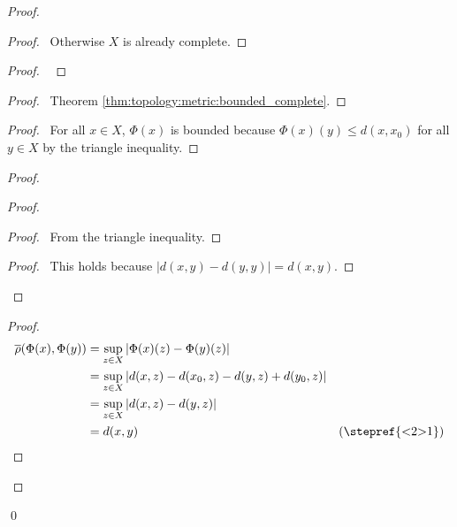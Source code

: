 \begin{proof}
  \pf
  \begin{proof}
    \pf\ Otherwise $X$ is already complete.
  \end{proof}
  \begin{proof}
    \pf\ 
  \end{proof}
  \begin{proof}
    \pf\ Theorem \ref{thm:topology:metric:bounded_complete}.
  \end{proof}
  \begin{proof}
    \pf\ For all $x \in X$, $\Phi(x)$ is bounded because $\Phi(x)(y) \leq d(x, x_0)$ for all $y \in X$ by the triangle inequality.
  \end{proof}
  \begin{proof}
    \begin{proof}
      \begin{proof}
        \pf\ From the triangle inequality.
      \end{proof}
      \begin{proof}
        \pf\ This holds because $|d(x, y) - d(y, y)| = d(x, y)$.
      \end{proof}
    \end{proof}
    \begin{proof}
      \pf
      \begin{align*}
        \overline{\rho}(\Phi(x), \Phi(y)) & = \sup_{z \in X} |\Phi(x)(z) - \Phi(y)(z)| \\
        & = \sup_{z \in X} |d(x, z) - d(x_0, z) - d(y, z) + d(y_0, z)| \\
        & = \sup_{z \in X} |d(x, z) - d(y, z)| \\
        & = d(x, y) & (\text{\stepref{<2>1}})
      \end{align*}
    \end{proof}
  \end{proof}
  \qed
\end{proof}

